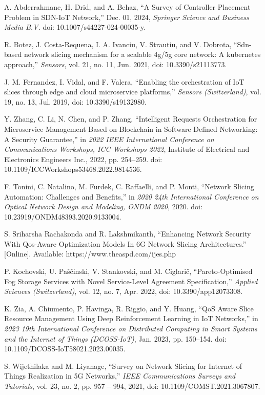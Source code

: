  A. Abderrahmane, H. Drid, and A. Behaz, ``A Survey of Controller Placement Problem in SDN-IoT Network,'' Dec. 01, 2024, \emph{Springer Science and Business Media B.V.} doi: 10.1007/s44227-024-00035-y.

 R. Botez, J. Costa-Requena, I. A. Ivanciu, V. Strautiu, and V. Dobrota, ``Sdn-based network slicing mechanism for a scalable 4g/5g core network: A kubernetes approach,'' \emph{Sensors}, vol. 21, no. 11, Jun. 2021, doi: 10.3390/s21113773.

 J. M. Fernandez, I. Vidal, and F. Valera, ``Enabling the orchestration of IoT slices through edge and cloud microservice platforms,'' \emph{Sensors (Switzerland)}, vol. 19, no. 13, Jul. 2019, doi: 10.3390/s19132980.

 Y. Zhang, C. Li, N. Chen, and P. Zhang, ``Intelligent Requests Orchestration for Microservice Management Based on Blockchain in Software Defined Networking: A Security Guarantee,'' in \emph{2022 IEEE International Conference on Communications Workshops, ICC Workshops 2022}, Institute of Electrical and Electronics Engineers Inc., 2022, pp. 254--259. doi: 10.1109/ICCWorkshops53468.2022.9814536.

 F. Tonini, C. Natalino, M. Furdek, C. Raffaelli, and P. Monti, ``Network Slicing Automation: Challenges and Benefits,'' in \emph{2020 24th International Conference on Optical Network Design and Modeling, ONDM 2020}, 2020. doi: 10.23919/ONDM48393.2020.9133004.

 S. Sriharsha Rachakonda and R. Lakshmikanth, ``Enhancing Network Security With Qos-Aware Optimization Models In 6G Network Slicing Architectures.'' {[}Online{]}. Available: https://www.theaspd.com/ijes.php

 P. Kochovski, U. Paščinski, V. Stankovski, and M. Ciglarič, ``Pareto-Optimised Fog Storage Services with Novel Service-Level Agreement Specification,'' \emph{Applied Sciences (Switzerland)}, vol. 12, no. 7, Apr. 2022, doi: 10.3390/app12073308.

 K. Zia, A. Chiumento, P. Havinga, R. Riggio, and Y. Huang, ``QoS Aware Slice Resource Management Using Deep Reinforcement Learning in IoT Networks,'' in \emph{2023 19th International Conference on Distributed Computing in Smart Systems and the Internet of Things (DCOSS-IoT)}, Jan. 2023, pp. 150--154. doi: 10.1109/DCOSS-IoT58021.2023.00035.

 S. Wijethilaka and M. Liyanage, ``Survey on Network Slicing for Internet of Things Realization in 5G Networks,'' \emph{IEEE Communications Surveys and Tutorials}, vol. 23, no. 2, pp. 957 -- 994, 2021, doi: 10.1109/COMST.2021.3067807.

